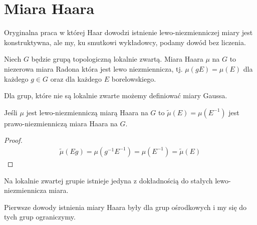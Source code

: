 \section{Miara Haara}

Oryginalna praca w której Haar dowodzi istnienie lewo-niezmienniczej miary jest konstruktywna, ale my, ku smutkowi wykładowcy, podamy dowód bez liczenia.

\begin{definition}{}{}
  Niech $G$ będzie grupą topologiczną lokalnie zwartą. Miara Haara $\mu$ na $G$ to niezerowa miara Radona która jest lewo niezmiennicza, tj. $\mu(gE)=\mu(E)$ dla każdego $g\in G$ oraz dla każdego $E$ borelowskiego.
\end{definition}

Dla grup, które nie są lokalnie zwarte możemy definiować miary Gaussa.

\begin{lemma}{}{}
  Jeśli $\mu$ jest lewo-niezmienniczą miarą Haara na $G$ to $\tilde{\mu}(E)=\mu(E^{-1})$ jest prawo-niezmienniczą miara Haara na $G$.
\end{lemma}

\begin{proof}
  \begin{align*}
    \tilde{\mu}(Eg)=\mu(g^{-1}E^{-1})=\mu(E^{-1})=\tilde{\mu}(E)
  \end{align*}
\end{proof}


\begin{theorem}{}{}
  Na lokalnie zwartej grupie istnieje jedyna z dokładnością do stałych lewo-niezmiennicza miara.
\end{theorem}

Pierwsze dowody istnienia miary Haara były dla grup ośrodkowych i my się do tych grup ograniczymy.

